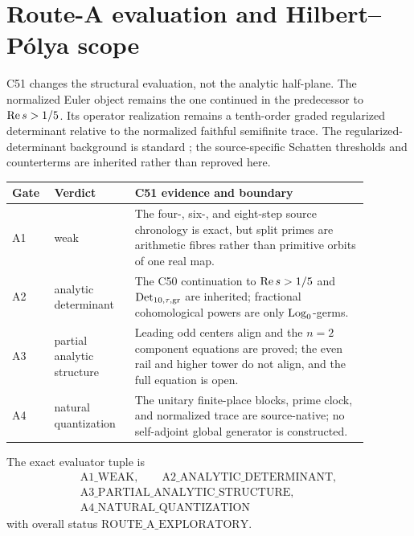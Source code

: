 \section{Route-A evaluation and Hilbert--P\'olya scope}\label{sec:route}

C51 changes the structural evaluation, not the analytic half-plane.  The
normalized Euler object remains the one continued in the predecessor to
\(\operatorname{Re} s>1/5\).  Its operator realization remains a tenth-order
graded regularized determinant relative to the normalized faithful
semifinite trace.  The regularized-determinant background is standard
\cite[Chapter 9]{Simon2005}; the source-specific Schatten thresholds and
counterterms are inherited rather than reproved here.

\begin{center}
\small
\begin{tabular}{@{}>{\raggedright\arraybackslash}p{0.09\linewidth}
                    >{\raggedright\arraybackslash}p{0.20\linewidth}
                    >{\raggedright\arraybackslash}p{0.59\linewidth}@{}}
\toprule
Gate & Verdict & C51 evidence and boundary\\
\midrule
A1 & weak &
The four-, six-, and eight-step source chronology is exact, but split
primes are arithmetic fibres rather than primitive orbits of one real map.\\
A2 & analytic determinant &
The C50 continuation to \(\operatorname{Re} s>1/5\) and
\(\operatorname{Det}_{10,\tau,\mathrm{gr}}\) are inherited; fractional cohomological
powers are only \(\operatorname{Log}_0\)-germs.\\
A3 & partial analytic structure &
Leading odd centers align and the \(n=2\) component equations are proved;
the even rail and higher tower do not align, and the full equation is open.\\
A4 & natural quantization &
The unitary finite-place blocks, prime clock, and normalized trace are
source-native; no self-adjoint global generator is constructed.\\
\bottomrule
\end{tabular}
\end{center}

The exact evaluator tuple is
\[
\begin{gathered}
 \mathrm{A1\_WEAK},\qquad
 \mathrm{A2\_ANALYTIC\_DETERMINANT},\\
 \mathrm{A3\_PARTIAL\_ANALYTIC\_STRUCTURE},\\
 \mathrm{A4\_NATURAL\_QUANTIZATION}
\end{gathered}
\]
with overall status \(\mathrm{ROUTE\_A\_EXPLORATORY}\).

